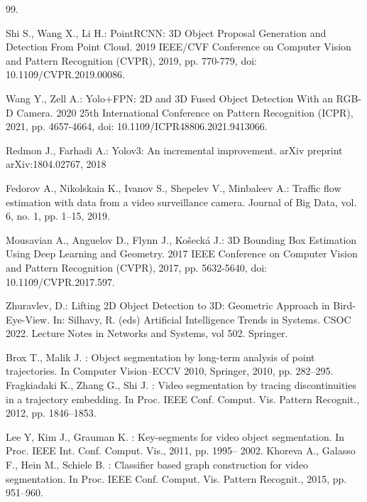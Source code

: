 % 
%
%
% 
% 
%

\begin{thebibliography}{99.}%
%
%

Shi S., Wang X., Li H.:
PointRCNN: 3D Object Proposal Generation and Detection From Point Cloud.
2019 IEEE/CVF Conference on Computer Vision and Pattern Recognition (CVPR), 2019, pp. 770-779, doi: 10.1109/CVPR.2019.00086.

Wang Y., Zell A.:
Yolo+FPN: 2D and 3D Fused Object Detection With an RGB-D Camera.
2020 25th International Conference on Pattern Recognition (ICPR), 2021, pp. 4657-4664, doi: 10.1109/ICPR48806.2021.9413066.

Redmon J., Farhadi A.:
Yolov3: An incremental improvement.
arXiv preprint arXiv:1804.02767, 2018

Fedorov A., Nikolskaia K., Ivanov S., Shepelev V., Minbaleev A.:
Traffic flow estimation with data from a video surveillance camera.
Journal of Big Data, vol. 6, no. 1, pp. 1–15, 2019.

Mousavian A., Anguelov D., Flynn J., Košecká J.:
3D Bounding Box Estimation Using Deep Learning and Geometry.
2017 IEEE Conference on Computer Vision and Pattern Recognition (CVPR), 2017, pp. 5632-5640, doi: 10.1109/CVPR.2017.597.

Zhuravlev, D.: Lifting 2D Object Detection to 3D: Geometric Approach in Bird-Eye-View. In: Silhavy, R. (eds) Artificial Intelligence Trends in Systems. CSOC 2022. Lecture Notes in Networks and Systems, vol 502. Springer.

Brox T., Malik J. : Object segmentation by long-term analysis of
point trajectories. In Computer Vision–ECCV 2010, Springer, 2010, pp.
282–295.
Fragkiadaki K., Zhang G., Shi J. : Video segmentation by tracing
discontinuities in a trajectory embedding. In Proc. IEEE Conf. Comput. Vis. Pattern Recognit., 2012, pp. 1846–1853.

Lee Y, Kim J., Grauman K. : Key-segments for video object
segmentation. In Proc. IEEE Int. Conf. Comput. Vis., 2011, pp. 1995–
2002.
Khoreva A., Galasso F., Hein M., Schiele B. : Classifier based graph
construction for video segmentation. In Proc. IEEE Conf. Comput. Vis.
Pattern Recognit., 2015, pp. 951–960.


\end{thebibliography}
